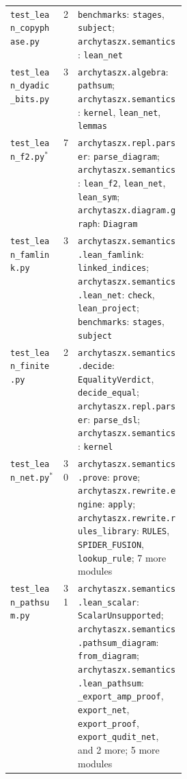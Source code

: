 \begin{xltabular}{\linewidth}{@{}>{\raggedright\arraybackslash}p{0.3\linewidth}r>{\raggedright\arraybackslash}X@{}}
\texttt{test\_\allowbreak{}lean\_\allowbreak{}copyphase.py} & 2 & \texttt{benchmarks}: \texttt{stages}, \texttt{subject}; \texttt{archytaszx.\allowbreak{}semantics}: \texttt{lean\_\allowbreak{}net} \\
\texttt{test\_\allowbreak{}lean\_\allowbreak{}dyadic\_\allowbreak{}bits.py} & 3 & \texttt{archytaszx.\allowbreak{}algebra}: \texttt{pathsum}; \texttt{archytaszx.\allowbreak{}semantics}: \texttt{kernel}, \texttt{lean\_\allowbreak{}net}, \texttt{lemmas} \\
\texttt{test\_\allowbreak{}lean\_\allowbreak{}f2.py}$^{\ast}$ & 7 & \texttt{archytaszx.\allowbreak{}repl.\allowbreak{}parser}: \texttt{parse\_\allowbreak{}diagram}; \texttt{archytaszx.\allowbreak{}semantics}: \texttt{lean\_\allowbreak{}f2}, \texttt{lean\_\allowbreak{}net}, \texttt{lean\_\allowbreak{}sym}; \texttt{archytaszx.\allowbreak{}diagram.\allowbreak{}graph}: \texttt{Diagram} \\
\texttt{test\_\allowbreak{}lean\_\allowbreak{}famlink.py} & 3 & \texttt{archytaszx.\allowbreak{}semantics.\allowbreak{}lean\_\allowbreak{}famlink}: \texttt{linked\_\allowbreak{}indices}; \texttt{archytaszx.\allowbreak{}semantics.\allowbreak{}lean\_\allowbreak{}net}: \texttt{check}, \texttt{lean\_\allowbreak{}project}; \texttt{benchmarks}: \texttt{stages}, \texttt{subject} \\
\texttt{test\_\allowbreak{}lean\_\allowbreak{}finite.py} & 2 & \texttt{archytaszx.\allowbreak{}semantics.\allowbreak{}decide}: \texttt{EqualityVerdict}, \texttt{decide\_\allowbreak{}equal}; \texttt{archytaszx.\allowbreak{}repl.\allowbreak{}parser}: \texttt{parse\_\allowbreak{}dsl}; \texttt{archytaszx.\allowbreak{}semantics}: \texttt{kernel} \\
\texttt{test\_\allowbreak{}lean\_\allowbreak{}net.py}$^{\ast}$ & 30 & \texttt{archytaszx.\allowbreak{}semantics.\allowbreak{}prove}: \texttt{prove}; \texttt{archytaszx.\allowbreak{}rewrite.\allowbreak{}engine}: \texttt{apply}; \texttt{archytaszx.\allowbreak{}rewrite.\allowbreak{}rules\_\allowbreak{}library}: \texttt{RULES}, \texttt{SPIDER\_\allowbreak{}FUSION}, \texttt{lookup\_\allowbreak{}rule}; 7 more modules \\
\texttt{test\_\allowbreak{}lean\_\allowbreak{}pathsum.py} & 31 & \texttt{archytaszx.\allowbreak{}semantics.\allowbreak{}lean\_\allowbreak{}scalar}: \texttt{ScalarUnsupported}; \texttt{archytaszx.\allowbreak{}semantics.\allowbreak{}pathsum\_\allowbreak{}diagram}: \texttt{from\_\allowbreak{}diagram}; \texttt{archytaszx.\allowbreak{}semantics.\allowbreak{}lean\_\allowbreak{}pathsum}: \texttt{\_\allowbreak{}export\_\allowbreak{}amp\_\allowbreak{}proof}, \texttt{export\_\allowbreak{}net}, \texttt{export\_\allowbreak{}proof}, \texttt{export\_\allowbreak{}qudit\_\allowbreak{}net}, and 2 more; 5 more modules \\

\end{xltabular}
